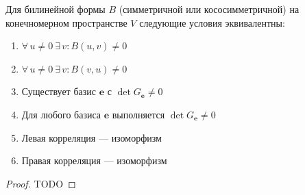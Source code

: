 \begin{theorem}
    Для билинейной формы $B$ (симметричной или кососимметричной) на конечномерном пространстве $V$ следующие условия эквивалентны:
    \begin{enumerate}
        \item $\forall\, u \neq 0\ \exists\, v\colon B(u, v) \neq 0$
        \item $\forall\, u \neq 0\ \exists\, v\colon B(v, u) \neq 0$
        \item Существует базис $\mathbf{e}$ с $\det G_{\mathbf{e}} \neq 0$
        \item Для любого базиса $\mathbf{e}$ выполняется $\det G_{\mathbf{e}} \neq 0$
        \item Левая корреляция --- изоморфизм
        \item Правая корреляция --- изоморфизм
    \end{enumerate}

    \begin{proof}
        TODO




    \end{proof}
\end{theorem}



